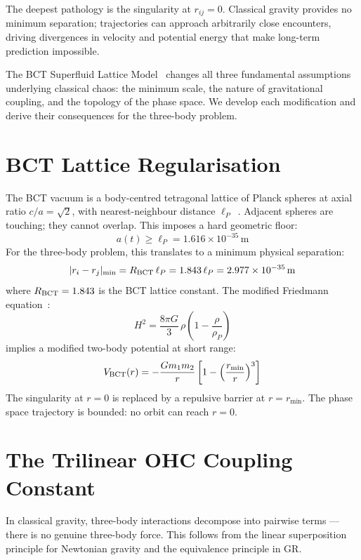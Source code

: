 \documentclass[twocolumn,10pt]{article}
\begin{document}
The deepest pathology is the singularity at $r_{ij} = 0$. Classical gravity provides no 
minimum separation; trajectories can approach arbitrarily close encounters, driving divergences 
in velocity and potential energy that make long-term prediction impossible.

The BCT Superfluid Lattice Model~\cite{bct_l1} changes all three fundamental assumptions 
underlying classical chaos: the minimum scale, the nature of gravitational coupling, and the 
topology of the phase space. We develop each modification and derive their consequences for the 
three-body problem.

\section{BCT Lattice Regularisation}

The BCT vacuum is a body-centred tetragonal lattice of Planck spheres at axial ratio 
$c/a = \sqrt{2}$, with nearest-neighbour distance $\ell_P$~\cite{bct_l1}. Adjacent spheres 
are touching; they cannot overlap. This imposes a hard geometric floor:
%
\begin{equation}
a(t) \geq \ell_P = 1.616\times10^{-35}\,\mathrm{m}
\end{equation}
%
For the three-body problem, this translates to a minimum physical separation:
%
\begin{equation}
|r_i - r_j|_{\min} = R_{\rm BCT}\,\ell_P = 1.843\,\ell_P = 2.977\times10^{-35}\,\mathrm{m}
\end{equation}
%
where $R_{\rm BCT} = 1.843$ is the BCT lattice constant. The modified Friedmann 
equation~\cite{bct_l56}:
%
\begin{equation}
H^2 = \frac{8\pi G}{3}\,\rho\!\left(1 - \frac{\rho}{\rho_P}\right)
\end{equation}
%
implies a modified two-body potential at short range:
%
\begin{equation}
V_{\rm BCT}(r) = -\frac{Gm_1 m_2}{r}\left[1 - \left(\frac{r_{\min}}{r}\right)^3\right]
\end{equation}
%
The singularity at $r = 0$ is replaced by a repulsive barrier at $r = r_{\min}$. The phase 
space trajectory is bounded: no orbit can reach $r = 0$.

\section{The Trilinear OHC Coupling Constant}

In classical gravity, three-body interactions decompose into pairwise terms --- there is no 
genuine three-body force. This follows from the linear superposition principle for Newtonian 
gravity and the equivalence principle in GR.
\end{document}
